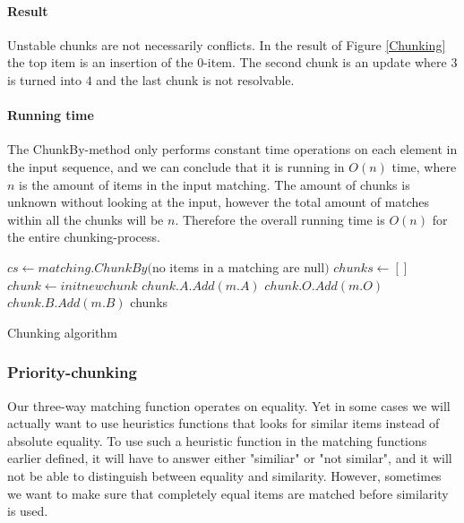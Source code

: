 \documentclass[11pt]{article}
\begin{document}
\paragraph{Result} Unstable chunks are not necessarily conflicts. In the result of Figure \ref{Chunking} the top item is an insertion of the $0$-item. The second chunk is an update where $3$ is turned into $4$ and the last chunk is not resolvable. 

\paragraph{Running time} The ChunkBy-method only performs constant time operations on each element in the input sequence, and we can conclude that it is running in $O(n)$ time, where $n$ is the amount of items in the input matching. The amount of chunks is unknown without looking at the input, however the total amount of matches within all the chunks will be $n$. Therefore the overall running time is $O(n)$ for the entire chunking-process.

\begin{algorithm}
\begin{algorithmic}
	\State $cs \gets matching.ChunkBy($no items in a matching are null$)$
	\State $chunks \gets []$
		\State $chunk \gets init new chunk$
				\State $chunk.A.Add(m.A)$
			\EndIf
				\State $chunk.O.Add(m.O)$
			\EndIf
				\State $chunk.B.Add(m.B)$
			\EndIf
		\EndFor
	\EndFor
	\State \Return chunks
\EndFunction
\end{algorithmic}
\caption{Chunking algorithm}
  \label{CunkingAlgorithm}
\end{algorithm}


\subsubsection{Priority-chunking}
\label{PriorityDiff}
Our three-way matching function operates on equality. Yet in some cases we will actually want to use heuristics functions that looks for similar items instead of absolute equality. To use such a heuristic function in the matching functions earlier defined, it will have to answer either "similiar" or "not similar", and it will not be able to distinguish between equality and similarity. However, sometimes we want to make sure that completely equal items are matched before similarity is used.
\end{document}
